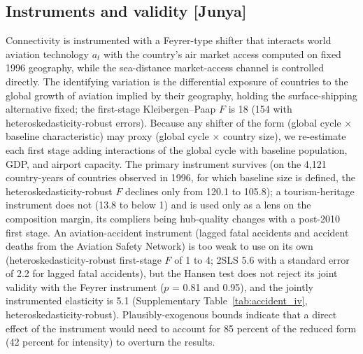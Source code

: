 \documentclass[12pt]{extarticle}
\begin{document}
\subsection*{Instruments and validity [Junya]}
Connectivity is instrumented with a Feyrer-type shifter that interacts
world aviation technology $a_t$ with the country's air market access
computed on fixed 1996 geography, while the sea-distance market-access
channel is controlled directly. The identifying variation is the
differential exposure of countries to the global growth of aviation implied
by their geography, holding the surface-shipping alternative fixed; the
first-stage Kleibergen--Paap $F$ is 18 (154 with heteroskedasticity-robust
errors). Because any shifter of the form
(global cycle $\times$ baseline characteristic) may proxy (global cycle
$\times$ country size), we re-estimate each first stage adding interactions
of the global cycle with baseline population, GDP, and airport capacity.
The primary instrument survives (on the 4,121 country-years of countries
observed in 1996, for which baseline size is defined, the
heteroskedasticity-robust $F$ declines only from 120.1 to 105.8);
a tourism-heritage instrument does not (13.8 to below 1) and is used only
as a lens on the composition margin, its compliers being hub-quality
changes with a post-2010 first stage. An aviation-accident instrument
(lagged fatal accidents and accident deaths from the Aviation Safety
Network) is too weak to use on its own (heteroskedasticity-robust
first-stage $F$ of 1 to 4; 2SLS 5.6 with a standard error of 2.2 for
lagged fatal accidents), but the Hansen test does not reject its joint
validity with the Feyrer instrument ($p$ = 0.81 and 0.95), and the jointly
instrumented elasticity is 5.1 (Supplementary
Table~\ref{tab:accident_iv}, heteroskedasticity-robust). Plausibly-exogenous bounds indicate that a direct
effect of the instrument would need to account for 85 percent of the
reduced form (42 percent for intensity) to overturn the results.
\end{document}
